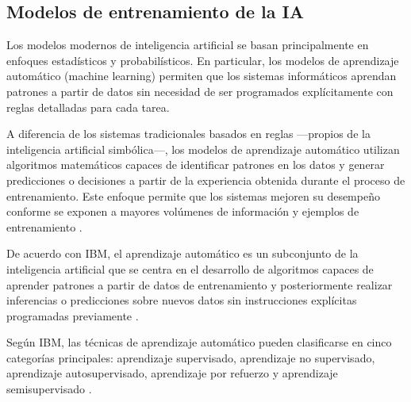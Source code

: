\subsection{Modelos de entrenamiento de la IA}

Los modelos modernos de inteligencia artificial se basan principalmente en enfoques estadísticos y probabilísticos. En particular, los modelos de aprendizaje automático (machine learning) permiten que los sistemas informáticos aprendan patrones a partir de datos sin necesidad de ser programados explícitamente con reglas detalladas para cada tarea.

A diferencia de los sistemas tradicionales basados en reglas —propios de la inteligencia artificial simbólica—, los modelos de aprendizaje automático utilizan algoritmos matemáticos capaces de identificar patrones en los datos y generar predicciones o decisiones a partir de la experiencia obtenida durante el proceso de entrenamiento. Este enfoque permite que los sistemas mejoren su desempeño conforme se exponen a mayores volúmenes de información y ejemplos de entrenamiento \cite{ibm2025aimodel}.

De acuerdo con IBM, el aprendizaje automático es un subconjunto de la inteligencia artificial que se centra en el desarrollo de algoritmos capaces de aprender patrones a partir de datos de entrenamiento y posteriormente realizar inferencias o predicciones sobre nuevos datos sin instrucciones explícitas programadas previamente \cite{ibm2025aimodel}.

Según IBM, las técnicas de aprendizaje automático pueden clasificarse en cinco categorías principales: aprendizaje supervisado, aprendizaje no supervisado, aprendizaje autosupervisado, aprendizaje por refuerzo y aprendizaje semisupervisado \cite{ibm2025_mltypes}.

